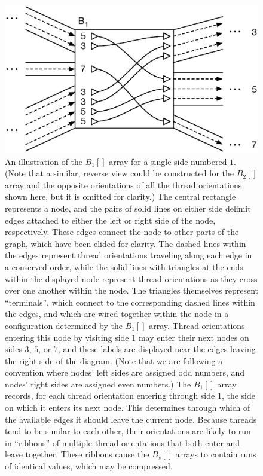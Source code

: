 \begin{figure}[h!]
\centering
\includegraphics[width=\linewidth]{figures/03_gpbwt/barray.eps}
\caption[An illustration of the {$B_{1}[]$} array]{An illustration of the $B_{1}[]$ array for a single side numbered $1$. (Note that a similar, reverse view could be constructed for the $B_2[]$ array and the opposite orientations of all the thread orientations shown here, but it is omitted for clarity.) The central rectangle represents a node, and the pairs of solid lines on either side delimit edges attached to either the left or right side of the node, respectively. These edges connect the node to other parts of the graph, which have been elided for clarity. The dashed lines within the edges represent thread orientations traveling along each edge in a conserved order, while the solid lines with triangles at the ends within the displayed node represent thread orientations as they cross over one another within the node. The triangles themselves represent ``terminals'', which connect to the corresponding dashed lines within the edges, and which are wired together within the node in a configuration determined by the $B_{1}[]$ array. Thread orientations entering this node by visiting side $1$ may enter their next nodes on sides $3$, $5$, or $7$, and these labels are displayed near the edges leaving the right side of the diagram. (Note that we are following a convention where nodes' left sides are assigned odd numbers, and nodes' right sides are assigned even numbers.) The $B_1[]$ array records, for each thread orientation entering through side $1$, the side on which it enters its next node. This determines through which of the available edges it should leave the current node. Because threads tend to be similar to each other, their orientations are likely to run in ``ribbons'' of multiple thread orientations that both enter and leave together. These ribbons cause the $B_s[]$ arrays to contain runs of identical values, which may be compressed.}
\label{fig:barray}
\end{figure}

